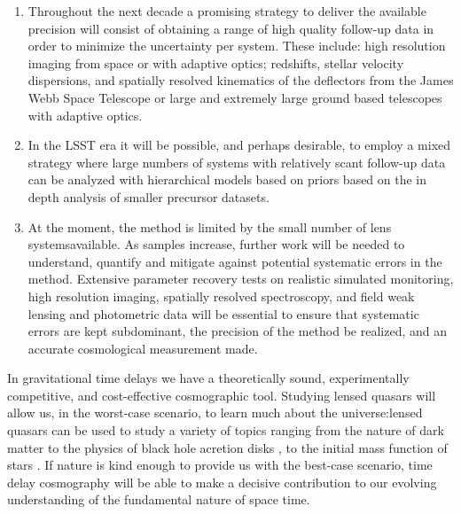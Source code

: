 \begin{enumerate}
\item Throughout the next decade a promising strategy to deliver the
available precision will consist of obtaining a
range of high quality follow-up data in order to minimize the
uncertainty per system. These include: high resolution imaging from
space or with adaptive optics; redshifts, stellar velocity dispersions,
and spatially resolved kinematics of the deflectors from the James Webb
Space Telescope or large and extremely large ground based telescopes with adaptive optics.
\item  In the LSST era it will be possible, and perhaps desirable,  to
employ a mixed strategy where large numbers of systems with relatively
scant follow-up data can be analyzed with hierarchical models based on
priors based on the in depth analysis of smaller precursor datasets.
\item  At the moment, the method is limited by the small number of lens systemsavailable. As samples increase, further work will be needed to understand, quantify and
mitigate against potential systematic errors in the method. Extensive parameter recovery tests on realistic simulated
monitoring, high resolution imaging, spatially resolved spectroscopy,
and field weak lensing and photometric data will be essential to ensure that systematic errors are kept subdominant, the precision of the method be realized, and an accurate cosmological measurement made. 
\end{enumerate}


%
%
In gravitational time delays we have a theoretically sound,
experimentally competitive, and cost-effective cosmographic tool.
%
Studying lensed
quasars will allow us, in the worst-case scenario, to learn much about
the universe:lensed quasars can be used to study a variety of topics
ranging from the nature of dark matter
\citep{Metcalf:2005p1203,Xu++09,Veg++14,Nie++14} to the physics of
black hole acretion disks \citep{PMK08,Blackburne:2010p6600}, to the
initial mass function of stars \citep{Sch++14}. If nature is kind
enough to provide us with the best-case scenario, time delay cosmography
will be able to
make a decisive contribution to our evolving understanding of the
fundamental nature of space time.
